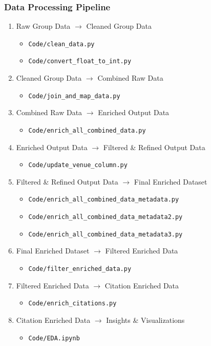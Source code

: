 \documentclass[12pt]{article}
\begin{document}
\subsubsection{Data Processing Pipeline}
\begin{enumerate}[label=\textbf{Step \arabic*:}]
    \item Raw Group Data $\rightarrow$ Cleaned Group Data
    \begin{itemize}
        \item \texttt{Code/clean\_data.py}
        \item \texttt{Code/convert\_float\_to\_int.py}
    \end{itemize}
    \item Cleaned Group Data $\rightarrow$ Combined Raw Data
    \begin{itemize}
        \item \texttt{Code/join\_and\_map\_data.py}
    \end{itemize}
    \item Combined Raw Data $\rightarrow$ Enriched Output Data
    \begin{itemize}
        \item \texttt{Code/enrich\_all\_combined\_data.py}
    \end{itemize}
    \item Enriched Output Data $\rightarrow$ Filtered \& Refined Output Data
    \begin{itemize}
        \item \texttt{Code/update\_venue\_column.py}
    \end{itemize}
    \item Filtered \& Refined Output Data $\rightarrow$ Final Enriched Dataset
    \begin{itemize}
        \item \texttt{Code/enrich\_all\_combined\_data\_metadata.py}
        \item \texttt{Code/enrich\_all\_combined\_data\_metadata2.py}
        \item \texttt{Code/enrich\_all\_combined\_data\_metadata3.py}
    \end{itemize}
    \item Final Enriched Dataset $\rightarrow$ Filtered Enriched Data
    \begin{itemize}
        \item \texttt{Code/filter\_enriched\_data.py}
    \end{itemize}
    \item Filtered Enriched Data $\rightarrow$ Citation Enriched Data
    \begin{itemize}
        \item \texttt{Code/enrich\_citations.py}
    \end{itemize}
    \item Citation Enriched Data $\rightarrow$ Insights \& Visualizations
    \begin{itemize}
        \item \texttt{Code/EDA.ipynb}
    \end{itemize}
\end{enumerate}
\end{document}
